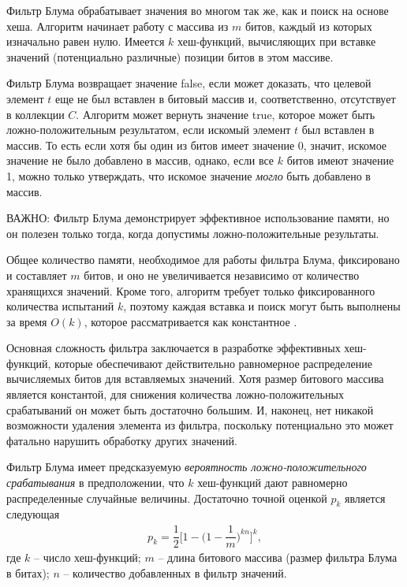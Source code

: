 \documentclass[%
	11pt,
	a4paper,
	utf8,
		]{article}
\begin{document}
Фильтр Блума обрабатывает значения во многом так же, как и поиск на основе хеша. Алгоритм начинает работу с массива из $ m $ битов, каждый из которых изначально равен нулю. Имеется $ k $ хеш-функций, вычисляющих при вставке значений (потенциально различные) позиции битов в этом массиве.

Фильтр Блума возвращает значение false, если может доказать, что целевой элемент $ t $ еще не был вставлен в битовый массив и, соответственно, отсутствует в коллекции $ C $. Алгоритм может вернуть значение true, которое может быть ложно-положительным результатом, если искомый элемент $ t $ был вставлен в массив. То есть если хотя бы один из битов имеет значение 0, значит, искомое значение не было добавлено в массив, однако, если все $ k $ битов имеют значение 1, можно только утверждать, что искомое значение \emph{могло} быть добавлено в массив.

ВАЖНО: Фильтр Блума демонстрирует эффективное использование памяти, но он полезен только тогда, когда допустимы ложно-положительные результаты. 

Общее количество памяти, необходимое для работы фильтра Блума, фиксировано и составляет $ m $ битов, и оно не увеличивается независимо от количество хранящихся значений. Кроме того, алгоритм требует только фиксированного количества испытаний $ k $, поэтому каждая вставка и поиск могут быть выполнены за время $ O(k) $, которое рассматривается как константное \cite[149]{heineman:2017}.

Основная сложность фильтра заключается в разработке эффективных хеш-функций, которые обеспечивают действительно равномерное распределение вычисляемых битов для вставляемых значений. Хотя размер битового массива является константой, для снижения количества ложно-положительных срабатываний он может быть достаточно большим. И, наконец, нет никакой возможности удаления элемента из фильтра, поскольку потенциально это может фатально нарушить обработку других значений.

Фильтр Блума имеет предсказуемую \emph{вероятность ложно-положительного срабатывания} в предположении, что $ k $ хеш-функций дают равномерно распределенные случайные величины. Достаточно точной оценкой $ p_k $ является следующая \cite[]{heineman:2017}
\begin{align*}
	p_k = \dfrac{1}{2} \Bigg[ 1 - \bigg( 1 - \dfrac{1}{m} \bigg)^{kn} \Bigg]^k,
\end{align*}
где $ k $ -- число хеш-функций; $ m $ -- длина битового массива (размер фильтра Блума в битах); $ n $ -- количество добавленных в фильтр значений.
\end{document}
